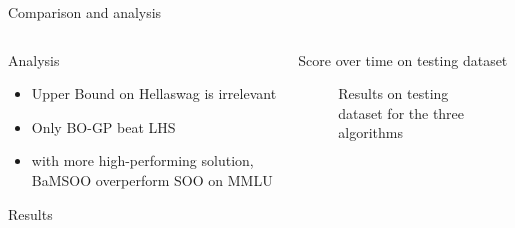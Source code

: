 \begin{frame}{Comparison and analysis}

    \begin{columns}
    
        \begin{column}{0.45\textwidth}

            \begin{block}{Analysis}
                \begin{itemize}
                    \item Upper Bound on Hellaswag is irrelevant
                    \item Only BO-GP beat LHS 
                    \item with more high-performing solution, BaMSOO overperform SOO on MMLU
                \end{itemize}
                
            \end{block}\vspace*{-10pt}
            
            \begin{block}{Results}
                
            \end{block}
            
            
            
        \end{column}

        \begin{column}{0.45\textwidth}
            \begin{block}{Score over time on testing dataset}
                \begin{figure}
                    \centering
                    
                    \caption{Results on testing dataset for the three algorithms}
                \end{figure}
            
            \end{block}  
             
        \end{column}
    \end{columns}    

\end{frame}